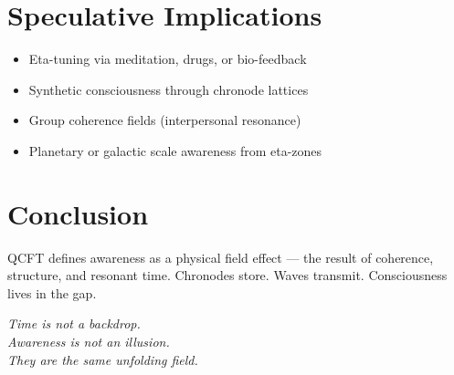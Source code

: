 \documentclass[12pt]{article}
\begin{document}
\section{Speculative Implications}

\begin{itemize}
\item Eta-tuning via meditation, drugs, or bio-feedback
\item Synthetic consciousness through chronode lattices
\item Group coherence fields (interpersonal resonance)
\item Planetary or galactic scale awareness from eta-zones
\end{itemize}

\section*{Conclusion}

QCFT defines awareness as a physical field effect — the result of coherence, structure, and resonant time. Chronodes store. Waves transmit. Consciousness lives in the gap.

\begin{center}
\textit{Time is not a backdrop.\\Awareness is not an illusion.\\They are the same unfolding field.}
\end{center}
\end{document}
